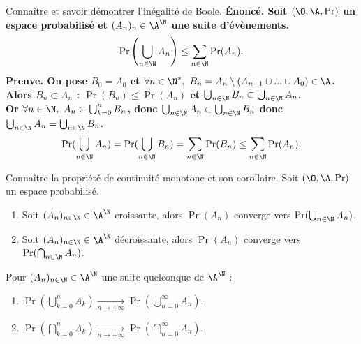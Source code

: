\documentclass[french, 11pt]{article}
\begin{document}
\begin{question}{}{}
    Connaître et savoir démontrer l'inégalité de Boole.
    \tcblower
    \bf{Énoncé.} Soit $(\O,\A,\Pr)$ un espace probabilisé et $(A_n)_n \in \A^\N$ une suite d'évènements.
    \begin{equation*}
        \Pr\left( \bigcup_{n\in\N} A_n \right) \leq \sum_{n\in\N}\Pr(A_n).
    \end{equation*}
    \bf{Preuve.} On pose $B_0 = A_0$ et $\forall n \in \N^*, ~ B_n = A_n \setminus (A_{n-1} \cup ... \cup A_0) \in \A$.\\
    Alors $B_n\subset A_n$ : $\Pr(B_n)\leq \Pr(A_n)$ et $\bigcup_{n\in\N} B_n \subset \bigcup_{n\in\N} A_n$.\\
    Or $\forall n \in \N, ~ A_n \subset \bigcup_{k=0}^n B_n$, donc $\bigcup_{n\in\N} A_n \subset \bigcup_{n\in\N} B_n$ donc $\bigcup_{n\in\N} A_n = \bigcup_{n\in\N} B_n$.
    \begin{equation*}
        \Pr(\bigcup_{n\in\N} A_n) = \Pr(\bigcup_{n\in\N} B_n) = \sum_{n\in\N}\Pr(B_n) \leq \sum_{n\in\N}\Pr(A_n).
    \end{equation*}
\end{question}

\vspace*{-0.5cm}

\begin{question}{}{}
    Connaître la propriété de continuité monotone et son corollaire.
    \tcblower
    Soit $(\O,\A,\Pr)$ un espace probabilisé.
    \begin{enumerate}
        \item Soit $(A_n)_{n\in\N}\in\A^\N$ croissante, alors $\Pr(A_n)$ converge vers $\Pr(\bigcup_{n\in\N}A_n)$.
        \item Soit $(A_n)_{n\in\N}\in\A^\N$ décroissante, alors $\Pr(A_n)$ converge vers $\Pr(\bigcap_{n\in\N}A_n)$.
    \end{enumerate}
    Pour $(A_n)_{n\in\N}\in\A^\N$ une suite quelconque de $\A^\N$ :
    \begin{enumerate}
        \item $\Pr(\bigcup_{k=0}^nA_k)\xrightarrow[n\to+\infty]{}\Pr(\bigcup_{n=0}^{\infty}A_n)$.
        \item $\Pr(\bigcap_{k=0}^nA_k)\xrightarrow[n\to+\infty]{}\Pr(\bigcap_{n=0}^{\infty}A_n)$.
    \end{enumerate}
\end{question}

\vspace*{-0.5cm}
\end{document}
